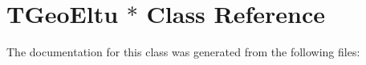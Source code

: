 \hypertarget{class_t_geo_eltu_01_5}{
\section{TGeoEltu $\ast$ Class Reference}
\label{class_t_geo_eltu_01_5}
}


The documentation for this class was generated from the following files: